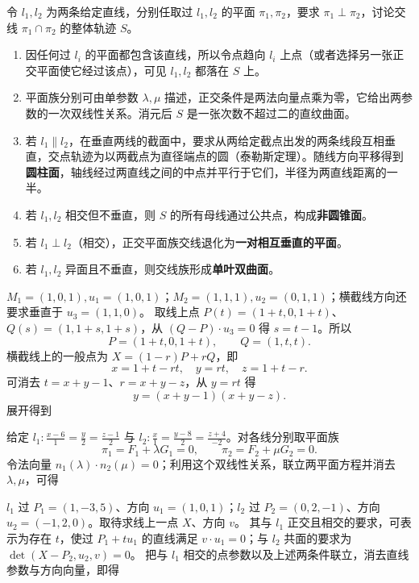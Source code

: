 令 $l_1,l_2$ 为两条给定直线，分别任取过 $l_1,l_2$ 的平面 $\pi_1,\pi_2$，要求 $\pi_1\perp\pi_2$，讨论交线 $\pi_1\cap\pi_2$ 的整体轨迹 $S$。
\begin{enumerate}[label=(\arabic*)]
\item 因任何过 $l_i$ 的平面都包含该直线，所以令点趋向 $l_i$ 上点（或者选择另一张正交平面使它经过该点），可见 $l_1,l_2$ 都落在 $S$ 上。
\item 平面族分别可由单参数 $\lambda,\mu$ 描述，正交条件是两法向量点乘为零，它给出两参数的一次双线性关系。消元后 $S$ 是一张次数不超过二的直纹曲面。
\item 若 $l_1\parallel l_2$，在垂直两线的截面中，要求从两给定截点出发的两条线段互相垂直，交点轨迹为以两截点为直径端点的圆（泰勒斯定理）。随线方向平移得到\textbf{圆柱面}，轴线经过两直线之间的中点并平行于它们，半径为两直线距离的一半。
\item 若 $l_1,l_2$ 相交但不垂直，则 $S$ 的所有母线通过公共点，构成\textbf{非圆锥面}。
\item 若 $l_1\perp l_2$（相交），正交平面族交线退化为\textbf{一对相互垂直的平面}。
\item 若 $l_1,l_2$ 异面且不垂直，则交线族形成\textbf{单叶双曲面}。
\end{enumerate}

$M_1=(1,0,1),u_1=(1,0,1)$；$M_2=(1,1,1),u_2=(0,1,1)$；横截线方向还要求垂直于 $u_3=(1,1,0)$。
取线上点 $P(t)=(1+t,0,1+t)$、$Q(s)=(1,1+s,1+s)$，从 $(Q-P)\cdot u_3=0$ 得 $s=t-1$。所以
\[P=(1+t,0,1+t),\qquad Q=(1,t,t).\]
横截线上的一般点为 $X=(1-r)P+rQ$，即
\[x=1+t-rt,\quad y=rt,\quad z=1+t-r.\]
可消去 $t=x+y-1$、$r=x+y-z$，从 $y=rt$ 得
\[y=(x+y-1)(x+y-z).\]
展开得到

给定 $l_1:\frac{x-6}{1}=\frac y2=\frac{z-1}2$ 与 $l_2:\frac x1=\frac{y-8}{2}=\frac{z+4}{-2}$。对各线分别取平面族
\[\pi_1=F_1+\lambda G_1=0,\qquad\pi_2=F_2+\mu G_2=0.\]
令法向量 $n_1(\lambda)\cdot n_2(\mu)=0$；利用这个双线性关系，联立两平面方程并消去 $\lambda,\mu$，可得

$l_1$ 过 $P_1=(1,-3,5)$、方向 $u_1=(1,0,1)$；$l_2$ 过 $P_2=(0,2,-1)$、方向 $u_2=(-1,2,0)$。取待求线上一点 $X$、方向 $v$。
其与 $l_1$ 正交且相交的要求，可表示为存在 $t$，使过 $P_1+t u_1$ 的直线满足 $v\cdot u_1=0$；与 $l_2$ 共面的要求为 $\det(X-P_2,u_2,v)=0$。
把与 $l_1$ 相交的点参数以及上述两条件联立，消去直线参数与方向向量，即得
\clearpage
